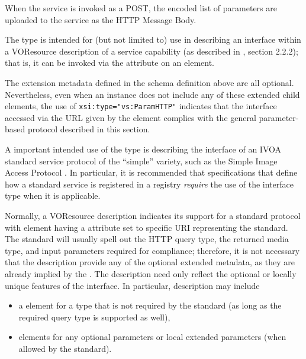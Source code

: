 \documentclass[11pt,a4paper]{ivoa}
\begin{document}
When the service is invoked as a POST, the encoded list of parameters
are uploaded to the service as the HTTP Message Body.  


The  type is intended for (but not limited
to) use in describing an interface within a VOResource description of
a service capability (as described in \citep{VOR},
section 2.2.2); that is, it can be invoked via the
 attribute on an 
element. 



The extension metadata defined in the schema definition above are all
optional.  Nevertheless, even when an 
instance does not include any of these extended child elements, the
use of \verb|xsi:type="vs:ParamHTTP"| indicates that the interface
accessed via the URL given by the 
element complies with the general parameter-based protocol described
in this section.  






A important intended use of the  type is
describing the interface of an IVOA standard service protocol 
of the ``simple'' variety, such as the Simple Image Access Protocol
\citep{SIA}.  In particular, it is recommended that
specifications that define how a standard service is registered in a
registry \emph{require} the use of the 
interface type when it is applicable.



Normally, a VOResource
description indicates its support for a standard protocol with
 element having a
 attribute set to specific URI representing the
standard.  The standard will usually spell out the HTTP query type,
the returned media type, and input parameters required for compliance;
therefore, it is not necessary that the 
description provide any of the optional extended metadata, as they are
already implied by the .  The description need
only reflect the optional or locally unique features of the
interface.  In particular, description may include


\begin{itemize}
\item a  element for a type that is not
  required by the standard (as long as the required query type is
  supported as well),

\item {} elements for any optional parameters
       or local extended parameters (when allowed by the standard).
\end{itemize}
\end{document}

